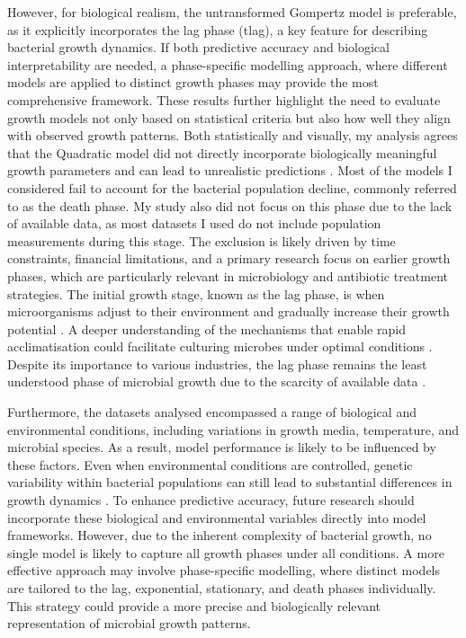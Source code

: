 \documentclass[11pt]{article}
\begin{document}
However, for biological realism, the untransformed Gompertz model is preferable, as it explicitly incorporates the lag phase (tlag), a key feature for describing bacterial growth dynamics. If both predictive accuracy and biological interpretability are needed, a phase-specific modelling approach, where different models are applied to distinct growth phases may provide the most comprehensive framework.
These results further highlight the need to evaluate growth models not only based on statistical criteria but also how well they align with observed growth patterns. Both statistically and visually, my analysis agrees that the Quadratic model did not directly incorporate biologically meaningful growth parameters and can lead to unrealistic predictions \parencite[]{Gibson1988}. Most of the models I considered fail to account for the bacterial population decline, commonly referred to as the death phase. My study also did not focus on this phase due to the lack of available data, as most datasets I used do not include population measurements during this stage. The exclusion is likely driven by time constraints, financial limitations, and a primary research focus on earlier growth phases, which are particularly relevant in microbiology and antibiotic treatment strategies. The initial growth stage, known as the lag phase, is when microorganisms adjust to their environment and gradually increase their growth potential \parencite{Kumakura2023}. A deeper understanding of the mechanisms that enable rapid acclimatisation could facilitate culturing microbes under optimal conditions \parencite{Rolfe2012}. Despite its importance to various industries, the lag phase remains the least understood phase of microbial growth due to the scarcity of available data \parencite[]{Rolfe2012}. 

Furthermore, the datasets analysed encompassed a range of biological and environmental conditions, including variations in growth media, temperature, and microbial species. As a result, model performance is likely to be influenced by these factors. Even when environmental conditions are controlled, genetic variability within bacterial populations can still lead to substantial differences in growth dynamics \parencite{Ackermann2015}. To enhance predictive accuracy, future research should incorporate these biological and environmental variables directly into model frameworks. However, due to the inherent complexity of bacterial growth, no single model is likely to capture all growth phases under all conditions. A more effective approach may involve phase-specific modelling, where distinct models are tailored to the lag, exponential, stationary, and death phases individually. This strategy could provide a more precise and biologically relevant representation of microbial growth patterns.
\end{document}
